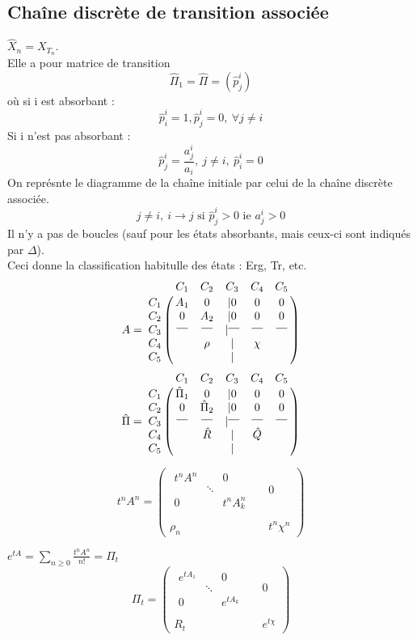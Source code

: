 \subsection{Chaîne discrète de transition associée}
$\hat{X}_n=X_{T_n}$.\\
Elle a pour matrice de transition \[\hat{\Pi}_1=\hat{\Pi}=(\hat{p}_j^i)\] où si i est absorbant :
	\[\hat{p}_i^i=1, \hat{p}_j^i=0,\ \forall j\neq i\]
Si i n'est pas absorbant :
	\[\hat{p}_j^i=\frac{a_j^i}{a_i},\ j\neq i,\ \hat{p}_i^i=0\]
On représnte le diagramme de la chaîne initiale par celui de la chaîne discrète associée.\\
\[j\neq i,\ i\to j \text{ si } \hat{p}_j^i>0 \text{ ie } a_j^i>0\]
Il n'y a pas de boucles (sauf pour les états absorbants, mais ceux-ci sont indiqués par $\Delta$). \\
Ceci donne la classification habitulle des états : Erg, Tr, etc.
\[A=\bordermatrix{&C_1 & C_2 & C_3 & C_4 & C_5\cr
C_1 & A_1 &  0  & |0 & 0 & 0\cr
C_2 &  0  & A_2 & |0 & 0 & 0\cr 
C_3 & \hbox{\raisebox{0.4em}{\vrule depth 0pt height 0.4pt width 1em}} & \hbox{\raisebox{0.4em}{\vrule depth 0pt height 0.4pt width 1em}} & |\hbox{\raisebox{0.4em}{\vrule depth 0pt height 0.4pt width 1em}} &\hbox{\raisebox{0.4em}{\vrule depth 0pt height 0.4pt width 1em}} &\hbox{\raisebox{0.4em}{\vrule depth 0pt height 0.4pt width 1em}} \cr
C_4 &     &  \rho  & |  & \chi &  \cr
C_5 &     &     &  | &  \cr}\]
\[\hat{\Pi}=\bordermatrix{&C_1 & C_2 & C_3 & C_4 & C_5\cr
C_1 & \hat{\Pi}_1 &  0  & |0 & 0 & 0\cr
C_2 &  0  & \hat{\Pi}_2 & |0 & 0 & 0\cr 
C_3 & \hbox{\raisebox{0.4em}{\vrule depth 0pt height 0.4pt width 1em}} & \hbox{\raisebox{0.4em}{\vrule depth 0pt height 0.4pt width 1em}} & |\hbox{\raisebox{0.4em}{\vrule depth 0pt height 0.4pt width 1em}} &\hbox{\raisebox{0.4em}{\vrule depth 0pt height 0.4pt width 1em}} &\hbox{\raisebox{0.4em}{\vrule depth 0pt height 0.4pt width 1em}} \cr
C_4 &     &  \hat{R}  & |  & \hat{Q} &  \cr
C_5 &     &     &  | &  \cr}\]

\[t^nA^n=\begin{pmatrix} \begin{matrix} t^nA^n & & 0 \\ & \ddots & \\ 0 & & t^n A_k^n \end{matrix} & & 0 \\ \\ \rho_n & & t^n\chi^n\end{pmatrix}\]

$e^{tA}=\sum_{n\geq 0} \frac{t^nA^n}{n!}=\Pi_t$
\[\Pi_t=\begin{pmatrix} \begin{matrix} e^{tA_1} & & 0 \\ & \ddots & \\ 0 & & e^{tA_k} \end{matrix} & & 0 \\ \\ R_t & & e^{t\chi}\end{pmatrix}\]

